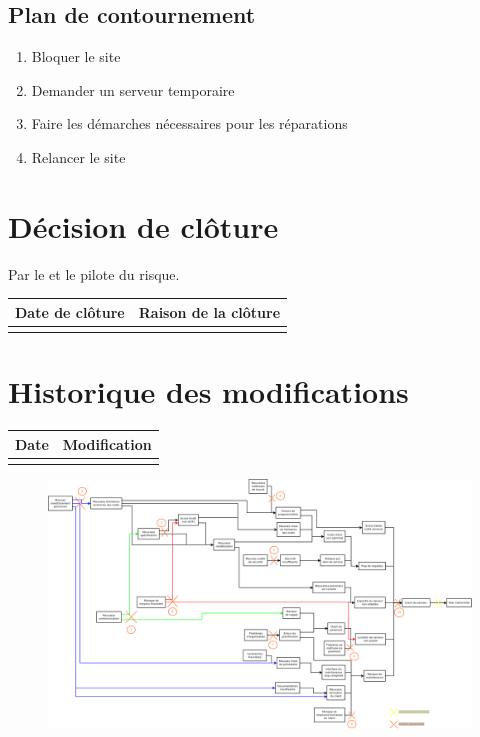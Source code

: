 \subsection*{Plan de contournement}

\begin{enumerate}
	\item Bloquer le site
	\item Demander un serveur temporaire
	\item Faire les démarches nécessaires pour les réparations
	\item Relancer le site
\end{enumerate}

\section*{Décision de clôture}
Par le \CP{} et le pilote du risque.
\begin{table}[h]
\centering
	\begin{tabularx}{16.8cm}{|X|X|}
	\hline
	Date de clôture & Raison de la clôture \\
	\hline
	  & \\
	\hline
	\end{tabularx}
\end{table}

\section*{Historique des modifications}
\begin{table}[h]
\centering
	\begin{tabularx}{16.8cm}{|X|X|}
	\hline
	Date & Modification \\%
	\hline
	  & \\
	\hline
	\end{tabularx}
\end{table}
\newpage


\begin{figure}
	\centering
	\includegraphics[scale=0.5]{images/AnalyseRisque_nPourquoi_FDR001.png}
\end{figure}